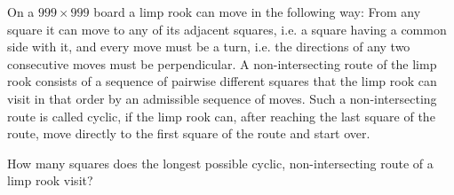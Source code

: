 On a $999\times 999$ board a limp rook can move in the following way: From any square it can move to any of its adjacent squares, i.e. a square having a common side with it, and every move must be a turn, i.e. the directions of any two consecutive moves must be perpendicular. A non-intersecting route of the limp rook consists of a sequence of pairwise different squares that the limp rook can visit in that order by an admissible sequence of moves. Such a non-intersecting route is called cyclic, if the limp rook can, after reaching the last square of the route, move directly to the first square of the route and start over.

How many squares does the longest possible cyclic, non-intersecting route of a limp rook visit?